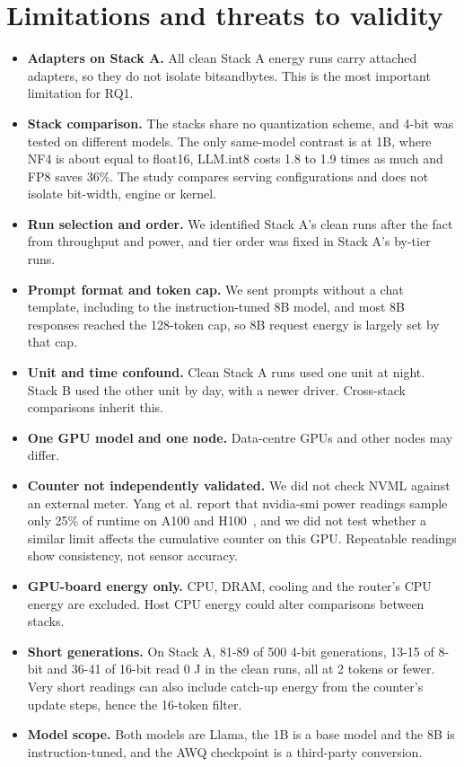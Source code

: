 \section{Limitations and threats to validity}
\begin{itemize}
\item \textbf{Adapters on Stack A.} All clean Stack A energy runs carry attached adapters, so they do not isolate bitsandbytes. This is the most important limitation for RQ1.
\item \textbf{Stack comparison.} The stacks share no quantization scheme, and 4-bit was tested on different models. The only same-model contrast is at 1B, where NF4 is about equal to float16, LLM.int8 costs 1.8 to 1.9 times as much and FP8 saves 36\%. The study compares serving configurations and does not isolate bit-width, engine or kernel.
\item \textbf{Run selection and order.} We identified Stack A's clean runs after the fact from throughput and power, and tier order was fixed in Stack A's by-tier runs.
\item \textbf{Prompt format and token cap.} We sent prompts without a chat template, including to the instruction-tuned 8B model, and most 8B responses reached the 128-token cap, so 8B request energy is largely set by that cap.
\item \textbf{Unit and time confound.} Clean Stack A runs used one unit at night. Stack B used the other unit by day, with a newer driver. Cross-stack comparisons inherit this.
\item \textbf{One GPU model and one node.} Data-centre GPUs and other nodes may differ.
\item \textbf{Counter not independently validated.} We did not check NVML against an external meter. Yang et al. report that nvidia-smi power readings sample only 25\% of runtime on A100 and H100~\cite{b17}, and we did not test whether a similar limit affects the cumulative counter on this GPU. Repeatable readings show consistency, not sensor accuracy.
\item \textbf{GPU-board energy only.} CPU, DRAM, cooling and the router's CPU energy are excluded. Host CPU energy could alter comparisons between stacks.
\item \textbf{Short generations.} On Stack A, 81-89 of 500 4-bit generations, 13-15 of 8-bit and 36-41 of 16-bit read 0 J in the clean runs, all at 2 tokens or fewer. Very short readings can also include catch-up energy from the counter's update steps, hence the 16-token filter.
\item \textbf{Model scope.} Both models are Llama, the 1B is a base model and the 8B is instruction-tuned, and the AWQ checkpoint is a third-party conversion.

\end{itemize}
